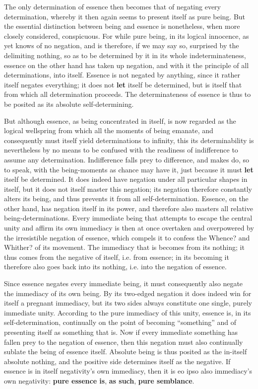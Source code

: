 \documentclass[12pt,a4paper,openany]{book}
\newcommand{\opage}[1]{\marginnote{\footnotesize\textit{[#1]}}}
\begin{document}
The only determination of essence then becomes that of negating every determination, whereby it then again seems to present itself as pure being. But the essential distinction between being and essence is nonetheless, when more closely considered, conspicuous. For while pure being, in its logical innocence, as yet knows of no negation, and is therefore, if we may say so, surprised by the delimiting nothing, so as to be determined by it in its whole indeterminateness, essence on the other hand has taken up negation, and with it the principle of all determinations, into itself. Essence is not negated by anything, since it rather itself negates everything; it does not \textbf{let} itself be determined, but is itself that from which all determination proceeds. The determinateness of essence is thus to be posited as its absolute self-determining.

But although essence, as being concentrated in itself, is now regarded as the logical wellspring from which all the moments of being emanate, and consequently must itself yield determinations to infinity, this its determinability is nevertheless by no means to be confused with the readiness of indifference to assume any determination. Indifference falls prey to difference, and makes do, so to speak, with the being-moments as chance may have it, just because it must \textbf{let} itself be determined. It does indeed have negation under all particular shapes in itself, but it does not itself master this negation; its negation therefore constantly alters its
\setcounter{footnote}{0}%
\opage{96}being, and thus prevents it from all self-determination. Essence, on the other hand, has negation itself in its power, and therefore also masters all relative being-determinations. Every immediate being that attempts to escape the central unity and affirm its own immediacy is then at once overtaken and overpowered by the irresistible negation of essence, which compels it to confess the Whence? and Whither? of its movement. The immediacy that is becomes from its nothing; it thus comes from the negative of itself, i.e. from essence; in its becoming it therefore also goes back into its nothing, i.e. into the negation of essence.

Since essence negates every immediate being, it must consequently also negate the immediacy of its own being. By its two-edged negation it does indeed win for itself a pregnant immediacy, but its two sides always constitute one single, purely immediate unity. According to the pure immediacy of this unity, essence is, in its self-determination, continually on the point of becoming ``something'' and of presenting itself as something that is. Now if every immediate something has fallen prey to the negation of essence, then this negation must also continually sublate the being of essence itself. Absolute being is thus posited as the in-itself absolute nothing, and the positive side determines itself as the negative. If essence is in itself negativity's own immediacy, then it is eo ipso also immediacy's own negativity: \textbf{pure essence is}, \textbf{as such}, \textbf{pure semblance}.
\end{document}
